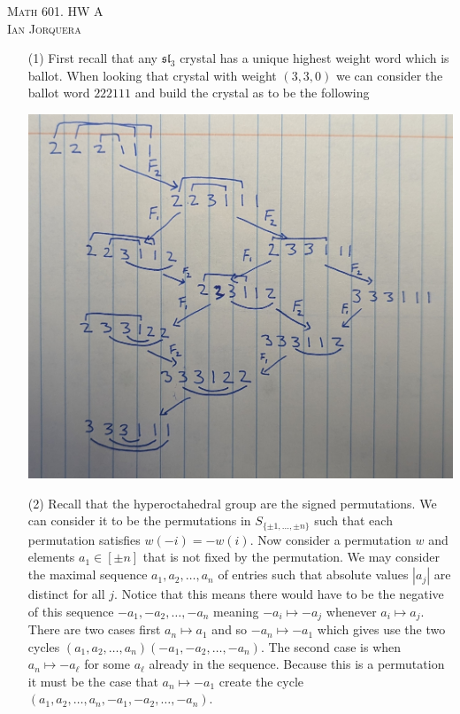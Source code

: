 \documentclass[12pt]{amsart}
\begin{document}
\begin{center}
    \textsc{Math 601. HW A\\ Ian Jorquera}
\end{center}
\vspace{1em}
\begin{itemize} %
    \item[(1)]
    First recall that any $\mathfrak{sl}_3$ crystal has a unique highest weight word 
    which is ballot. When looking that crystal with weight $(3,3,0)$ we can consider the 
    ballot word $222111$ and build the crystal as to be the following

    \includegraphics[scale=.16]{hwb-1.png}

    \item[(2)]
    Recall that the hyperoctahedral group are the signed permutations. We can consider it to be 
    the permutations in $S_{\{\pm 1,\dots,\pm n\}}$ such that each permutation satisfies 
    $w(-i)=-w(i)$. Now consider a permutation $w$ and elements $a_1\in [\pm n]$ that is 
    not fixed by the permutation. We may consider the maximal sequence $a_1,a_2,\dots,a_n$
    of entries such that absolute values $|a_j|$ are distinct for all $j$.
    Notice that this means there would have to be the negative of this sequence
    $-a_1,-a_2,\dots,-a_n$ meaning $-a_i\mapsto -a_j$ whenever $a_i\mapsto a_j$. 
    There are two cases first $a_n\mapsto a_1$ and so $-a_n\mapsto -a_1$ which gives use the 
    two cycles $(a_1,a_2,\dots,a_n)(-a_1,-a_2,\dots,-a_n)$. The second case is when 
    $a_n\mapsto -a_\ell$ for some $a_\ell$ already in the sequence. Because this is a permutation
    it must be the case that $a_n\mapsto -a_1$ create the cycle $(a_1,a_2,\dots,a_n,-a_1,-a_2,\dots,-a_n)$.\\


\end{itemize}
\end{document}

